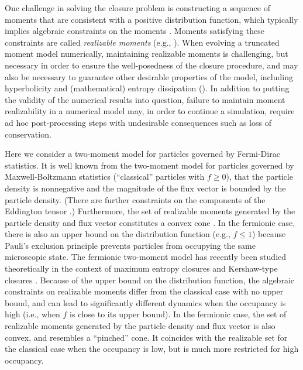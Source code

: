 One challenge in solving the closure problem is constructing a sequence of moments that are consistent with a positive distribution function, which typically implies algebraic constraints on the moments \cite{kershaw_1976,levermore_1984}.  
Moments satisfying these constraints are called \emph{realizable moments} (e.g., \cite{levermore_1996}).  
When evolving a truncated moment model numerically, maintaining realizable moments is challenging, but necessary in order to ensure the well-posedness of the closure procedure, and may also be necessary to guarantee other desirable properties of the model, including hyperbolicity and (mathematical) entropy dissipation ().  
In addition to putting the validity of the numerical results into question, failure to maintain moment realizability in a numerical model may, in order to continue a simulation, require ad hoc post-processing steps with undesirable consequences such as loss of conservation.  

Here we consider a two-moment model for particles governed by Fermi-Dirac statistics.  
It is well known from the two-moment model for particles governed by Maxwell-Boltzmann statistics (``classical'' particles with $f\ge0$), that the particle density is nonnegative and the magnitude of the flux vector is bounded by the particle density.  
(There are further constraints on the components of the Eddington tensor \cite{levermore_1984}.)  
Furthermore, the set of realizable moments generated by the particle density and flux vector constitutes a convex cone \cite{olbrant_etal_2012}.  
In the fermionic case, there is also an upper bound on the distribution function (e.g., $f\le1$) because Pauli's exclusion principle prevents particles from occupying the same microscopic state.  
The fermionic two-moment model has recently been studied theoretically in the context of maximum entropy closures \cite{lareckiBanach_2011,banachLarecki_2013,banachLarecki_2017b} and Kershaw-type closures \cite{banachLarecki_2017a}.  
Because of the upper bound on the distribution function, the algebraic constraints on realizable moments differ from the classical case with no upper bound, and can lead to significantly different dynamics when the occupancy is high (i.e., when $f$ is close to its upper bound).  
In the fermionic case, the set of realizable moments generated by the particle density and flux vector is also convex, and resembles a ``pinched'' cone.  
It coincides with the realizable set for the classical case when the occupancy is low, but is much more restricted for high occupancy.  

